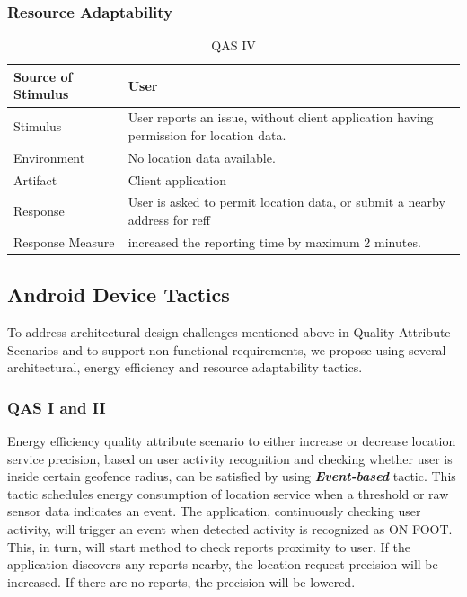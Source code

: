 \subsubsection{Resource Adaptability}

\begin{table}[H]
\centering
\caption{QAS IV}
\label{tab:qasIV}
\begin{tabularx}{\textwidth}{|l|X|}
\hline
Source of Stimulus & User \\ \hline
Stimulus & User reports an issue, without client application having permission for location data. \\ \hline
Environment & No location data available. \\ \hline
Artifact & Client application \\ \hline
Response & User is asked to permit location data, or submit a nearby address for reff \\ \hline
Response Measure & increased the reporting time by maximum 2 minutes. \\ \hline
\end{tabularx}
\end{table}

\subsection{Android Device Tactics}
To address architectural design challenges mentioned above in Quality Attribute Scenarios and to support non-functional requirements, we propose using several architectural, energy efficiency and resource adaptability tactics.

\subsubsection{QAS I and II}
Energy efficiency quality attribute scenario to either increase or decrease location service precision, based on user activity recognition and checking whether user is inside certain geofence radius, can be satisfied by using \textbf{\textit{Event-based}} tactic. This tactic schedules energy consumption of location service when a threshold or raw sensor data indicates an event. The application, continuously checking user activity, will trigger an event when detected activity is recognized as ON FOOT. This, in turn, will start method to check reports proximity to user.  If the application discovers any reports nearby, the location request precision will be increased. If there are no reports, the precision will be lowered.

